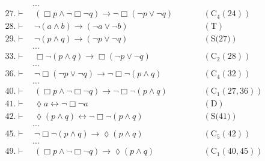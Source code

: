\documentclass[a4paper, 12pt]{report}
\begin{document}
{{\begin{equation*}
\begin{alignedat}{2}
                               & \ldots && \\
                    27. \vdash & \ (\Box p \land \lnot \Box \lnot q) \to \lnot \Box (\lnot p \lor \lnot q) && \quad \quad (\mbox{C}_4(24)) \\
                    28. \vdash & \ \lnot (a \land b) \to (\lnot a \lor \lnot b) && \quad \quad (\mbox{T}) \\
                    29. \vdash & \ \lnot (p \land q) \to (\lnot p \lor \lnot q) && \quad \quad (\mbox{S(27)}) \\
                               & \ldots && \\
                    33. \vdash & \ \Box \lnot (p \land q) \to \Box (\lnot p \lor \lnot q) && \quad \quad (\mbox{C}_2(28)) \\
                               & \ldots && \\
                    36. \vdash & \ \lnot \Box(\lnot p \lor \lnot q) \to \lnot \Box \lnot (p \land q) && \quad \quad (\mbox{C}_4(32)) \\
                               & \ldots && \\
                    40. \vdash & \ (\Box p \land \lnot \Box \lnot q) \to \lnot \Box \lnot (p \land q) && \quad \quad (\mbox{C}_1(27, 36)) \\
                    41. \vdash & \ \lozenge a \leftrightarrow \lnot \Box \lnot a && \quad \quad (\mbox{D}) \\
                    42. \vdash & \ \lozenge(p \land q) \leftrightarrow \lnot \Box \lnot (p \land q) && \quad \quad (\mbox{S(41)}) \\
                               & \ldots && \\
                    45. \vdash & \ \lnot \Box \lnot (p \land q) \to \lozenge(p \land q) &&\quad \quad (\mbox{C}_5(42)) \\
                               & \ldots && \\
                    49. \vdash & \ (\Box p \land \lnot \Box \lnot q) \to \lozenge(p \land q) && \quad \quad (\mbox{C}_1(40, 45)) \\
                \end{alignedat}
            \end{equation*}

}}
\end{document}

